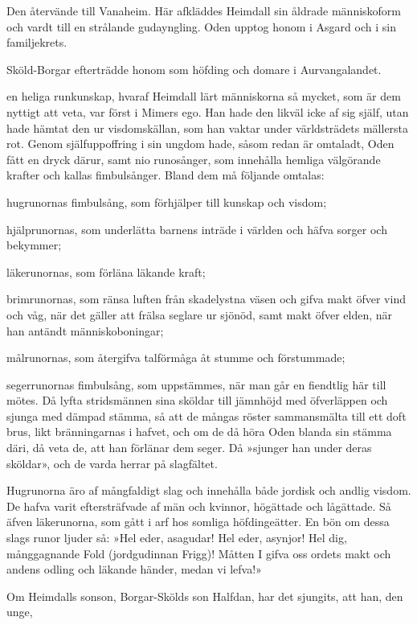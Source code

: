 Den återvände till Vanaheim. Här afkläddes Heimdall sin åldrade
människoform och vardt till en strålande gudayngling. Oden upptog honom
i Asgard och i sin familjekrets.

Sköld-Borgar efterträdde honom som höfding och domare i Aurvangalandet.



\dropcapD en heliga runkunskap, hvaraf Heimdall lärt människorna så mycket, som
är dem nyttigt att veta, var först i Mimers ego. Han hade den likväl
icke af sig själf, utan hade hämtat den ur visdomskällan, som han vaktar
under världsträdets mällersta rot. Genom själfuppoffring i sin ungdom
hade, såsom redan är omtaladt, Oden fått en dryck därur, samt nio
runosånger, som innehålla hemliga välgörande krafter och kallas
fimbulsånger. Bland dem må följande omtalas:

hugrunornas fimbulsång, som förhjälper till kunskap och visdom;

hjälprunornas, som underlätta barnens inträde i världen och häfva sorger
och bekymmer;

läkerunornas, som förläna läkande kraft;

brimrunornas, som ränsa luften från skadelystna väsen
och gifva makt öfver vind och våg, när det gäller att frälsa seglare ur
sjönöd, samt makt öfver elden, när han antändt människoboningar;

målrunornas, som återgifva talförmåga åt stumme och förstummade;

segerrunornas fimbulsång, som uppstämmes, när man går en fiendtlig här
till mötes. Då lyfta stridsmännen sina sköldar till jämnhöjd med
öfverläppen och sjunga med dämpad stämma, så att de mångas röster
sammansmälta till ett doft brus, likt bränningarnas i hafvet, och om de
då höra Oden blanda sin stämma däri, då veta de, att han förlänar dem
seger. Då »sjunger han under deras sköldar», och de varda herrar på
slagfältet.

Hugrunorna äro af mångfaldigt slag och innehålla både jordisk och andlig
visdom. De hafva varit eftersträfvade af män och kvinnor, högättade och
lågättade. Så äfven läkerunorna, som gått i arf hos somliga
höfdingeätter. En bön om dessa slags runor ljuder så: »Hel eder,
asagudar! Hel eder, asynjor! Hel dig, månggagnande Fold (jordgudinnan
Frigg)! Måtten I gifva oss ordets makt och andens odling och läkande
händer, medan vi lefva!»

Om Heimdalls sonson, Borgar-Skölds son Halfdan, har det sjungits, att
han, den unge,

